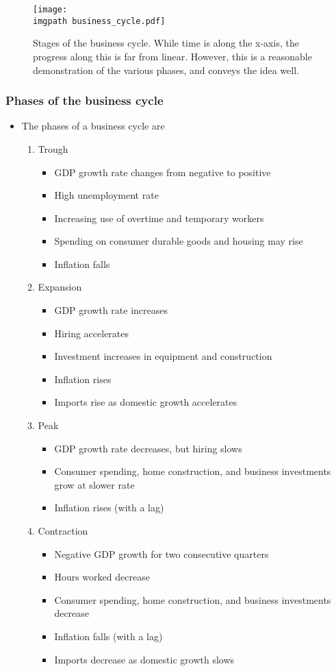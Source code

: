 \documentclass[../notes_compiled.tex]{subfiles}
\begin{document}
\begin{figure}[h]
  \centering
  \texttt{[image: \\imgpath business\_cycle.pdf]}
  \caption{Stages of the business cycle. While time is along the x-axis, the progress along this is far from linear. However, this is a reasonable demonstration of the various phases, and conveys the idea well.}
\end{figure}

\subsubsection{Phases of the business cycle}
\begin{itemize}
\item The phases of a business cycle are
\begin{enumerate}
\item Trough
\begin{itemize}
\item GDP growth rate changes from negative to positive
\item High unemployment rate
\item Increasing use of overtime and temporary workers
\item Spending on consumer durable goods and housing may rise
\item Inflation falls
\end{itemize}

\item Expansion
\begin{itemize}
\item GDP growth rate increases
\item Hiring accelerates
\item Investment increases in equipment and construction
\item Inflation rises
\item Imports rise as domestic growth accelerates
\end{itemize}

\item Peak
\begin{itemize}
\item GDP growth rate decreases, but hiring slows
\item Consumer spending, home construction, and business investments grow at slower rate
\item Inflation rises (with a lag)
\end{itemize}

\item Contraction
\begin{itemize}
\item Negative GDP growth for two consecutive quarters
\item Hours worked decrease
\item Consumer spending, home construction, and business investments decrease
\item Inflation falls (with a lag)
\item Imports decrease as domestic growth slows
\end{itemize}


\end{enumerate}
\end{itemize}
\end{document}
